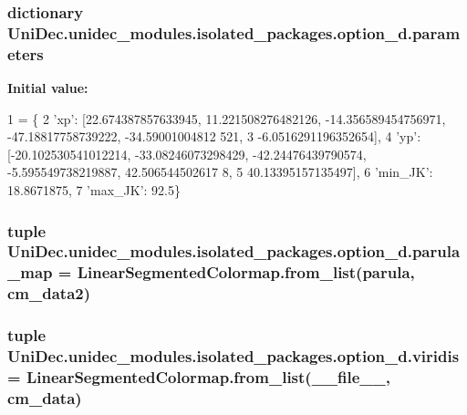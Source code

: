 \subsubsection[{parameters}]{\setlength{\rightskip}{0pt plus 5cm}dictionary Uni\+Dec.\+unidec\+\_\+modules.\+isolated\+\_\+packages.\+option\+\_\+d.\+parameters}\label{namespace_uni_dec_1_1unidec__modules_1_1isolated__packages_1_1option__d_a734500ea3e09747746659f32150b19ea}
{\bfseries Initial value\+:}
\begin{DoxyCode}
1 = \{
2     \textcolor{stringliteral}{'xp'}: [22.674387857633945, 11.221508276482126, -14.356589454756971, -47.18817758739222, -34.59001004812
      521,
3            -6.0516291196352654],
4     \textcolor{stringliteral}{'yp'}: [-20.102530541012214, -33.08246073298429, -42.24476439790574, -5.595549738219887, 42.506544502617
      8,
5            40.13395157135497],
6     \textcolor{stringliteral}{'min\_JK'}: 18.8671875,
7     \textcolor{stringliteral}{'max\_JK'}: 92.5\}
\end{DoxyCode}
\hypertarget{namespace_uni_dec_1_1unidec__modules_1_1isolated__packages_1_1option__d_a18ad24df6407f120d54a338882c6f1a6}{}
\subsubsection[{parula\+\_\+map}]{\setlength{\rightskip}{0pt plus 5cm}tuple Uni\+Dec.\+unidec\+\_\+modules.\+isolated\+\_\+packages.\+option\+\_\+d.\+parula\+\_\+map = Linear\+Segmented\+Colormap.\+from\+\_\+list(\textquotesingle{}parula\textquotesingle{}, {\bf cm\+\_\+data2})}\label{namespace_uni_dec_1_1unidec__modules_1_1isolated__packages_1_1option__d_a18ad24df6407f120d54a338882c6f1a6}
\hypertarget{namespace_uni_dec_1_1unidec__modules_1_1isolated__packages_1_1option__d_a5690716cac2b77c4f29d94f62a4a4ac6}{}
\subsubsection[{viridis}]{\setlength{\rightskip}{0pt plus 5cm}tuple Uni\+Dec.\+unidec\+\_\+modules.\+isolated\+\_\+packages.\+option\+\_\+d.\+viridis = Linear\+Segmented\+Colormap.\+from\+\_\+list(\+\_\+\+\_\+file\+\_\+\+\_\+, {\bf cm\+\_\+data})}\label{namespace_uni_dec_1_1unidec__modules_1_1isolated__packages_1_1option__d_a5690716cac2b77c4f29d94f62a4a4ac6}
